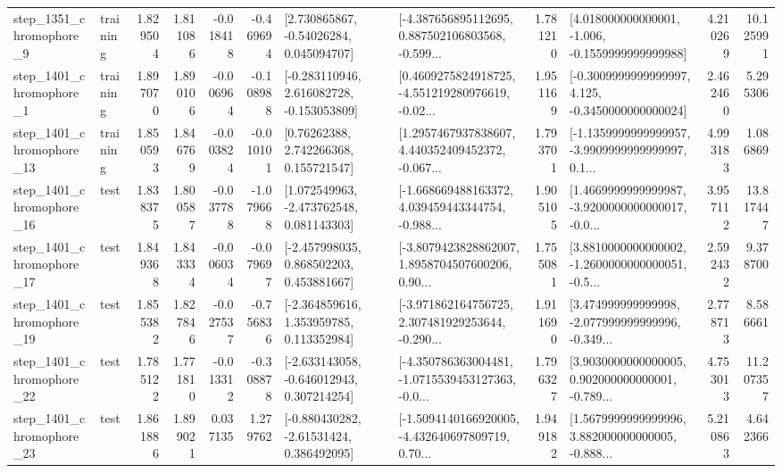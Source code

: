 \begin{tabular}{llrrrrllrlrr}
  step\_1351\_chromophore\_9 &  training &      1.829504 &    1.811086 &     -0.018418 & -0.469694 &     [2.730865867, -0.54026284, 0.045094707] &  [-4.387656895112695, 0.887502106803568, -0.599... &       1.781210 &   [4.018000000000001, -1.006, -0.1559999999999988] &            4.210269 &         10.125991 \\
  step\_1401\_chromophore\_1 &  training &      1.897070 &    1.890106 &     -0.006964 & -0.108988 &   [-0.283110946, 2.616082728, -0.153053809] &  [0.4609275824918725, -4.551219280976619, -0.02... &       1.951169 &  [-0.3009999999999997, 4.125, -0.3450000000000024] &            2.462460 &          5.295306 \\
 step\_1401\_chromophore\_13 &  training &      1.850593 &    1.846769 &     -0.003824 & -0.010101 &      [0.76262388, 2.742266368, 0.155721547] &  [1.2957467937838607, 4.440352409452372, -0.067... &       1.793701 &  [-1.1359999999999957, -3.9909999999999997, 0.1... &            4.993183 &          1.086869 \\
 step\_1401\_chromophore\_16 &      test &      1.838375 &    1.800587 &     -0.037788 & -1.079668 &    [1.072549963, -2.473762548, 0.081143303] &  [-1.668669488163372, 4.039459443344754, -0.988... &       1.905105 &  [1.4669999999999987, -3.9200000000000017, -0.0... &            3.957112 &         13.817447 \\
 step\_1401\_chromophore\_17 &      test &      1.849368 &    1.843334 &     -0.006034 & -0.079697 &    [-2.457998035, 0.868502203, 0.453881667] &  [-3.8079423828862007, 1.8958704507600206, 0.90... &       1.755081 &  [3.8810000000000002, -1.2600000000000051, -0.5... &            2.592432 &          9.378700 \\
 step\_1401\_chromophore\_19 &      test &      1.855382 &    1.827846 &     -0.027537 & -0.756836 &    [-2.364859616, 1.353959785, 0.113352984] &  [-3.971862164756725, 2.307481929253644, -0.290... &       1.911690 &  [3.474999999999998, -2.077999999999996, -0.349... &            2.778713 &          8.586661 \\
 step\_1401\_chromophore\_22 &      test &      1.785122 &    1.771810 &     -0.013312 & -0.308878 &   [-2.633143058, -0.646012943, 0.307214254] &  [-4.350786363004481, -1.0715539453127363, -0.0... &       1.796327 &  [3.9030000000000005, 0.902000000000001, -0.789... &            4.753013 &         11.207357 \\
 step\_1401\_chromophore\_23 &      test &      1.861886 &    1.899021 &      0.037135 &  1.279762 &    [-0.880430282, -2.61531424, 0.386492095] &  [-1.5094140166920005, -4.432640697809719, 0.70... &       1.949182 &  [1.5679999999999996, 3.882000000000005, -0.888... &            5.210863 &          4.642366 \\

\end{tabular}
